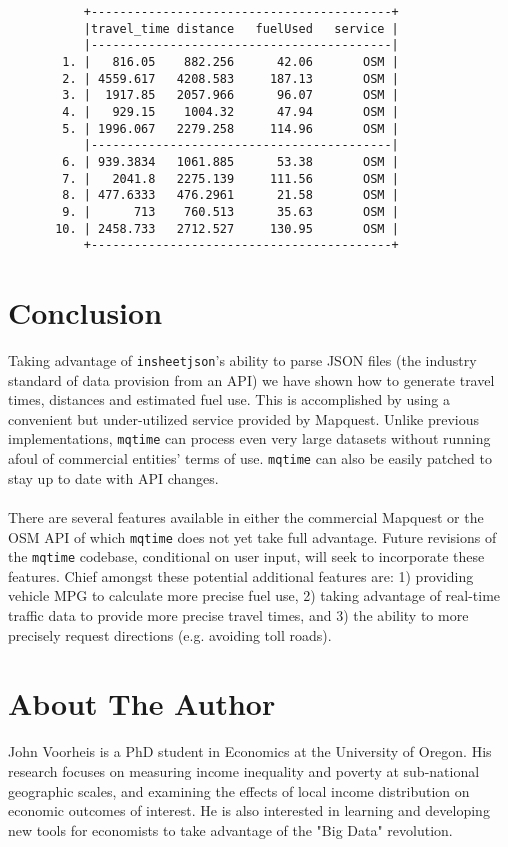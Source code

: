 \documentclass[11pt]{article}
\begin{document}
\begin{figure}[ht]
\begin{center}
{\footnotesize
\begin{verbatim}
     +------------------------------------------+
     |travel_time distance   fuelUsed   service |
     |------------------------------------------|
  1. |   816.05    882.256      42.06       OSM |
  2. | 4559.617   4208.583     187.13       OSM |
  3. |  1917.85   2057.966      96.07       OSM |
  4. |   929.15    1004.32      47.94       OSM |
  5. | 1996.067   2279.258     114.96       OSM |
     |------------------------------------------|
  6. | 939.3834   1061.885      53.38       OSM |
  7. |   2041.8   2275.139     111.56       OSM |
  8. | 477.6333   476.2961      21.58       OSM |
  9. |      713    760.513      35.63       OSM |
 10. | 2458.733   2712.527     130.95       OSM |
     +------------------------------------------+
\end{verbatim}
}
\end{center}
\end{figure}

\section{Conclusion}
Taking advantage of \verb|insheetjson|'s ability to parse JSON files (the industry standard of data provision from an API) we have shown how to generate travel times, distances and estimated fuel use. This is accomplished by using a convenient but under-utilized service provided by Mapquest. Unlike previous implementations, \verb|mqtime| can process even very large datasets without running afoul of commercial entities' terms of use. \verb|mqtime| can also be easily patched to stay up to date with API changes. 
\\ \\
There are several features available in either the commercial Mapquest or the OSM API of which \verb|mqtime| does not yet take full advantage. Future revisions of the \verb|mqtime| codebase, conditional on user input, will seek to incorporate these features. Chief amongst these potential additional features are: 1) providing vehicle MPG to calculate more precise fuel use, 2) taking advantage of real-time traffic data to provide more precise travel times, and 3) the ability to more precisely request directions (e.g. avoiding toll roads).



\nocite{Ozimek2011, Traveltime3, MapquestTOU, OSMTOU}

\section*{About The Author}
John Voorheis is a PhD student in Economics at the University of Oregon. His research focuses on measuring income inequality and poverty at sub-national geographic scales, and examining the effects of local income distribution on economic outcomes of interest. He is also interested in learning and developing new tools for economists to take advantage of the "Big Data" revolution.
\end{document}
